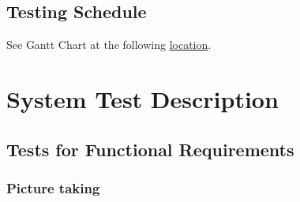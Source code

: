 \documentclass[12pt, titlepage]{article}
\begin{document}
\subsection{Testing Schedule}
		
See Gantt Chart at the following  \href{https://gitlab.cas.mcmaster.ca/kowserm/3xa3/tree/master/ProjectSchedule}{location}.

\section{System Test Description}
	
\subsection{Tests for Functional Requirements}

\subsubsection{Picture taking}
		
\end{document}
